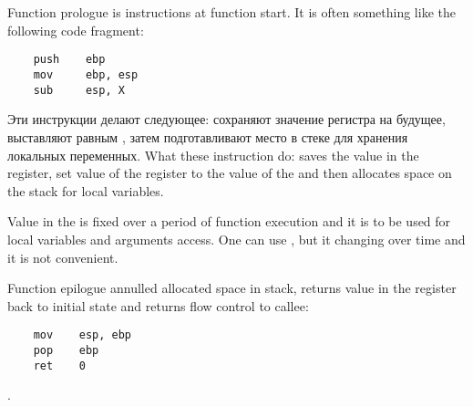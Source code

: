 \chapter{}
\label{sec:prologepilog}

{Function prologue is instructions at function start. It is often something like the following
code fragment:}

\begin{lstlisting}
    push    ebp
    mov     ebp, esp
    sub     esp, X
\end{lstlisting}

\IFRU
{Эти инструкции делают следующее: сохраняют значение регистра \EBP на будущее, выставляют \EBP равным \ESP, 
затем подготавливают место в стеке для хранения локальных переменных.}
{What these instruction do: saves the value in the \EBP register,
set value of the \EBP register to the value of the \ESP and then allocates space on the stack 
for local variables.}

{Value in the \EBP is fixed over a period of function execution and it is to be used for local variables and 
arguments access. 
One can use \ESP, but it changing over time and it is not convenient.}

{Function epilogue annulled allocated space in stack, returns value in the \EBP register back to initial state 
and returns flow control to \gls{callee}:}

\begin{lstlisting}
    mov    esp, ebp
    pop    ebp
    ret    0
\end{lstlisting}

.

\section{\Recursion}


